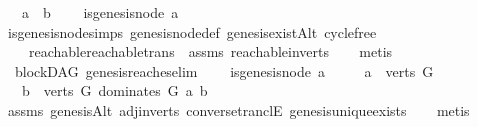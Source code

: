 \begin{isabellebody}
\ \ \ {\isachardoublequoteopen}a\ {\isasymrightarrow}\isactrlsup {\isacharplus}{\kern0pt}\ b{\isachardoublequoteclose}\isanewline
\ \ \ {\isachardoublequoteopen}{\isasymnot}\ is{\isacharunderscore}{\kern0pt}genesis{\isacharunderscore}{\kern0pt}node\ a{\isachardoublequoteclose}\isanewline
%
\isadelimproof
\ \ %
\endisadelimproof
%
\isatagproof
{}\isamarkupfalse%
\ is{\isacharunderscore}{\kern0pt}genesis{\isacharunderscore}{\kern0pt}node{\isachardot}{\kern0pt}simps\ genesis{\isacharunderscore}{\kern0pt}node{\isacharunderscore}{\kern0pt}def\ genesis{\isacharunderscore}{\kern0pt}existAlt\ cycle{\isacharunderscore}{\kern0pt}free\ \isanewline
\ \ \ \ reachable{}{\isacharunderscore}{\kern0pt}reachable{\isacharunderscore}{\kern0pt}trans\ \ assms\ reachable{}{\isacharunderscore}{\kern0pt}in{\isacharunderscore}{\kern0pt}verts{\isacharparenleft}{\kern0pt}{}{\isacharparenright}{\kern0pt}\isanewline
\ \ \isamarkupfalse%
\ {\isacharparenleft}{\kern0pt}metis{\isacharparenright}{\kern0pt}%
\endisatagproof
{\isafoldproof}%
%
\isadelimproof
\ \isanewline
%
\endisadelimproof
\isanewline
{}\isamarkupfalse%
\ {\isacharparenleft}{\kern0pt}\ blockDAG{\isacharparenright}{\kern0pt}\ genesis{\isacharunderscore}{\kern0pt}reaches{\isacharunderscore}{\kern0pt}elim{\isacharcolon}{\kern0pt}\isanewline
\ \ \ {\isachardoublequoteopen}{\isasymnot}\ is{\isacharunderscore}{\kern0pt}genesis{\isacharunderscore}{\kern0pt}node\ a{\isachardoublequoteclose}\isanewline
\ \ \ \ \ {\isachardoublequoteopen}a\ {\isasymin}\ verts\ G{\isachardoublequoteclose}\isanewline
\ \ \ {\isachardoublequoteopen}{\isasymexists}b\ {\isasymin}\ {\isacharparenleft}{\kern0pt}verts\ G{\isacharparenright}{\kern0pt}{\isachardot}{\kern0pt}\ dominates\ G\ a\ b{\isachardoublequoteclose}\isanewline
%
\isadelimproof
\ \ %
\endisadelimproof
%
\isatagproof
{}\isamarkupfalse%
\ assms\ genesisAlt{}\ adj{\isacharunderscore}{\kern0pt}in{\isacharunderscore}{\kern0pt}verts{\isacharparenleft}{\kern0pt}{}{\isacharparenright}{\kern0pt}\ converse{\isacharunderscore}{\kern0pt}tranclE\ genesis{\isacharunderscore}{\kern0pt}unique{\isacharunderscore}{\kern0pt}exists\isanewline
\ \ \isamarkupfalse%
\ metis%
\endisatagproof
{\isafoldproof}%
%
\isadelimproof
%
\endisadelimproof
%
\isadelimdocument
%
\endisadelimdocument
%
\isatagdocument
%
\isamarkuptrue%
%
\endisatagdocument

\end{isabellebody}
